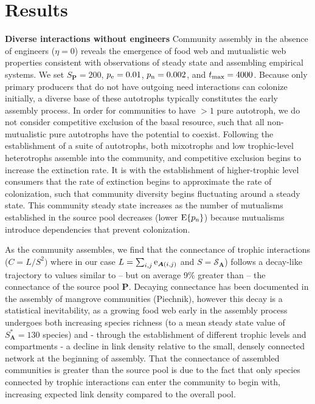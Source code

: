 \documentclass[twocolumn,preprintnumbers,amsmath,amssymb,superscriptaddress]{revtex4}
\newcommand{\rr}[1]{{\rm #1}}
\begin{document}
\section*{Results}

\textbf{Diverse interactions without engineers} Community assembly in the absence of engineers ($\eta=0$) reveals the emergence of food web and mutualistic web properties consistent with observations of steady state and assembling empirical systems.
We set $S_{\bm P}=200$, $p_\rr{e}=0.01$, $p_\rr{n}=0.002$, and $t_\rr{max}=4000$.
Because only primary producers that do not have outgoing need interactions can colonize initially, a diverse base of these autotrophs typically constitutes the early assembly process.
In order for communities to have $>1$ pure autotroph, we do not consider competitive exclusion of the basal resource, such that all non-mutualistic pure autotrophs have the potential to coexist.
Following the establishment of a suite of autotrophs, both mixotrophs and low trophic-level heterotrophs assemble into the community, and competitive exclusion begins to increase the extinction rate.
It is with the establishment of higher-trophic level consumers that the rate of extinction begins to approximate the rate of colonization, such that community diversity begins fluctuating around a steady state.
This community steady state increases as the number of mutualisms established in the source pool decreases (lower $\rr{E}\{p_\rr{n}\}$) because mutualisms introduce dependencies that prevent colonization.

As the community assembles, we find that the connectance of trophic interactions ($C=L/S^2)$ where in our case $L=\sum_{i,j} \rr{e}_{{\bm A}(i,j)}$ and $S = \mathcal{S}_{\bm A}$) follows a decay-like trajectory to values similar to -- but on average 9\% greater than -- the connectance of the source pool $\bm{P}$.
Decaying connectance has been documented in the assembly of mangrove communities (Piechnik), however this decay is a statistical inevitability, as a growing food web early in the assembly process undergoes both increasing species richness (to a mean steady state value of $S^*_{\bm A}=130$ species) and - through the establishment of different trophic levels and compartments - a decline in link density relative to the small, densely connected network at the beginning of assembly.
That the connectance of assembled communities is greater than the source pool is due to the fact that only species connected by trophic interactions can enter the community to begin with, increasing expected link density compared to the overall pool.
\end{document}
